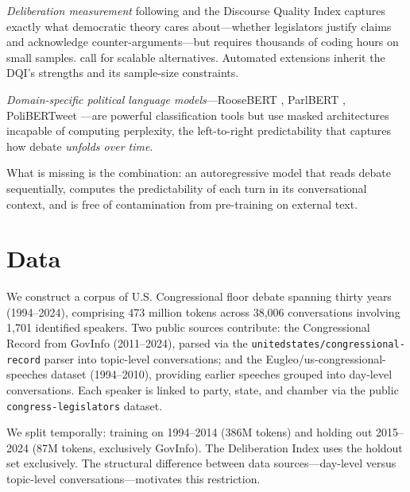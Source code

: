 \documentclass[12pt]{article}
\begin{document}
\textit{Deliberation measurement} following \citet{steiner2004} and the Discourse Quality Index captures exactly what democratic theory cares about---whether legislators justify claims and acknowledge counter-arguments---but requires thousands of coding hours on small samples. \citet{bachtiger2019} call for scalable alternatives. Automated extensions \citep{fournierTombs2021, flores2024} inherit the DQI's strengths and its sample-size constraints.

\textit{Domain-specific political language models}---RooseBERT \citep{evrard2025}, ParlBERT \citep{klamm2022}, PoliBERTweet \citep{kawintiranon2022}---are powerful classification tools but use masked architectures incapable of computing perplexity, the left-to-right predictability that captures how debate \textit{unfolds over time}.

What is missing is the combination: an autoregressive model that reads debate sequentially, computes the predictability of each turn in its conversational context, and is free of contamination from pre-training on external text.


\section{Data}

We construct a corpus of U.S. Congressional floor debate spanning thirty years (1994--2024), comprising 473 million tokens across 38,006 conversations involving 1,701 identified speakers. Two public sources contribute: the Congressional Record from GovInfo \citep{govinfo} (2011--2024), parsed via the \texttt{unitedstates/\allowbreak{}congressional-record} parser \citep{unitedstates_parser} into topic-level conversations; and the Eugleo/\allowbreak{}us-congressional-speeches dataset \citep{eugleo2023} (1994--2010), providing earlier speeches grouped into day-level conversations. Each speaker is linked to party, state, and chamber via the public \texttt{congress-legislators} dataset.

We split temporally: training on 1994--2014 (386M tokens) and holding out 2015--2024 (87M tokens, exclusively GovInfo). The Deliberation Index uses the holdout set exclusively. The structural difference between data sources---day-level versus topic-level conversations---motivates this restriction.
\end{document}
